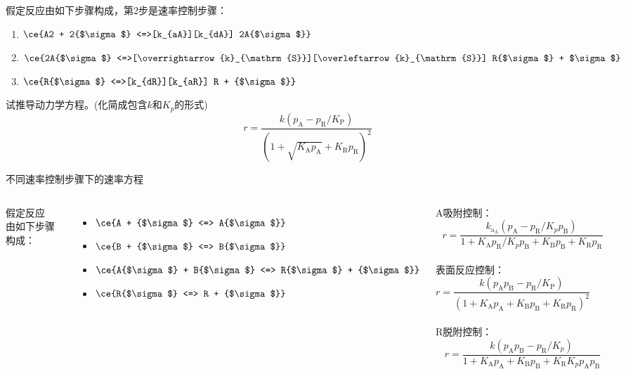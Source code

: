 \begin{frame}[t]
    \frametitle{}
    \begin{question}
        假定反应由如下步骤构成，第2步是速率控制步骤：
            \begin{enumerate}
                \item  $\ce{A2 + 2{$\sigma$} <=>[k_{aA}][k_{dA}] 2A{$\sigma$}}$ 
                \item  $\ce{2A{$\sigma$} <=>[\overrightarrow{k}_{\mathrm{S}}][\overleftarrow{k}_{\mathrm{S}}] R{$\sigma$} + $\sigma$}$
                \item  $\ce{R{$\sigma$} <=>[k_{dR}][k_{aR}] R + {$\sigma$}}$
            \end{enumerate}
        试推导动力学方程。(化简成包含$k$和$K_p$的形式)
        \tcblower
        \pause
        \[
            r = \frac{k(p_{\mathrm{A}} -p_{\mathrm{R}} / K_{\mathrm{P}})}{(1+\sqrt{K_{\mathrm{A}} p_{\mathrm{A}}} + K_{\mathrm{R}} p_{\mathrm{R}})^{2}}
        \]
    \end{question}
\end{frame}


\begin{frame}{不同速率控制步骤下的速率方程}
    \begin{columns}[c]
        \column{7cm}
        假定反应
        \\由如下步骤构成：
            \begin{itemize}
                \item[]  $\ce{A + {$\sigma$} <=> A{$\sigma$}}$ 
                \item[]  $\ce{B + {$\sigma$} <=> B{$\sigma$}}$
                \item[]  $\ce{A{$\sigma$} + B{$\sigma$} <=> R{$\sigma$} + {$\sigma$}}$
                \item[]  $\ce{R{$\sigma$} <=> R + {$\sigma$}}$
            \end{itemize}
        \column{7cm}
            A吸附控制：
            $$r=\frac{k_{\mathrm{a}_{\mathrm{A}}}(p_{\mathrm{A}}-p_{\mathrm{R}} / K_{p} p_{\mathrm{B}})}{1+K_{\mathrm{A}} p_{\mathrm{R}} / K_{p} p_{\mathrm{B}}+K_{\mathrm{B}} p_{\mathrm{B}}+K_{\mathrm{R}} p_{\mathrm{R}}}$$
            \\表面反应控制：
            $$r=\frac{k(p_{\mathrm{A}} p_{\mathrm{B}}-p_{\mathrm{R}} / K_{\mathrm{P}})}{(1+K_{\mathrm{A}} p_{\mathrm{A}}+K_{\mathrm{B}} p_{\mathrm{B}}+K_{\mathrm{R}} p_{\mathrm{R}})^{2}}\qquad$$
            \\R脱附控制：
            $$r=\frac{k(p_{\mathrm{A}} p_{\mathrm{B}}-p_{\mathrm{R}} / K_{p})}{1+K_{\mathrm{A}} p_{\mathrm{A}}+K_{\mathrm{B}} p_{\mathrm{B}}+K_{\mathrm{R}} K_{p} p_{\mathrm{A}} p_{\mathrm{B}}}$$
    \end{columns}
\end{frame}



